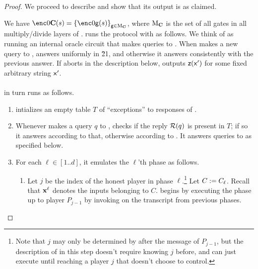 \documentclass{article}
\begin{document}
\begin{proof}
\noindent 
We proceed to describe \advv and show that its output is as claimed.
 
 We have $\enc0{\circ(s)} =\sett{\enc0{\gate(s)}}{\gate\in \mulofcirc}$,
 where $\mathrm{M}_\mathbf{C}$ is the set of all gates in all multiply/divide layers of \circ.
 \advv runs the protocol with \adv as follows.
 We think of \advv as running an internal oracle circuit \advvprime that makes queries to \RO.
 When \advvprime makes a new query to \RO, \advv answers uniformly in \G21, and otherwise it answers consistently with the previous answer.
 If \advvprime aborts in the description below, \advv outputs $\mathsf{z}(\mathsf{x}')$ for some fixed arbitrary string $\mathsf{x}'$.\\ \\
\noindent
 \advvprime in turn runs \adv as follows.
 \begin{enumerate}
 \item \advvprime intializes an empty table $T$ of ``exceptions'' to responses of \RO .
   \item Whenever \adv makes a query $q$ to \RO, \advvprime checks if the reply ${\cal R}(q)$ is present in $T$; if so it answers according to that,
   otherwise according to \RO. It answers queries to \RB as specified below.
   \item For each $\ell\in [1..d]$, it emulates the $\ell$'th phase as follows.
   \begin{enumerate}
    \item\label{itm:KEA1} Let $j$ be the index of the honest player in phase $\ell$.\footnote{Note that $j$ may only be determined by \adv after the message of $P_{j-1}$, but the description of \advvprime in this step doesn't require knowing $j$ before, and \advvprime can just  execute \adv until reaching a player $j$ that \adv doesn't choose to control.} Let $C:= C_\ell$. Recall that $\mathbf{x}^\ell$ denotes the inputs belonging to $C$.
 \advvprime begins by executing the phase up to player $P_{j-1}$ by invoking \adv on the transcript from previous phases.
 

\end{enumerate}
\end{enumerate}
\end{proof}
\end{document}
